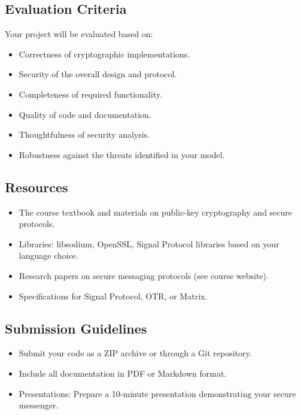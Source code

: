 \documentclass[10pt,a4paper,american]{article}
\begin{document}
\subsection*{Evaluation Criteria}
Your project will be evaluated based on:

\begin{itemize}
	\item Correctness of cryptographic implementations.
	\item Security of the overall design and protocol.
	\item Completeness of required functionality.
	\item Quality of code and documentation.
	\item Thoughtfulness of security analysis.
	\item Robustness against the threats identified in your model.
\end{itemize}

\subsection*{Resources}
\begin{itemize}
	\item The course textbook and materials on public-key cryptography and secure protocols.
	\item Libraries: libsodium, OpenSSL, Signal Protocol libraries based on your language choice.
	\item Research papers on secure messaging protocols (see course website).
	\item Specifications for Signal Protocol, OTR, or Matrix.
\end{itemize}

\subsection*{Submission Guidelines}
\begin{itemize}
	\item Submit your code as a ZIP archive or through a Git repository.
	\item Include all documentation in PDF or Markdown format.
	\item Presentations: Prepare a 10-minute presentation demonstrating your secure messenger.
\end{itemize}
\end{document}
